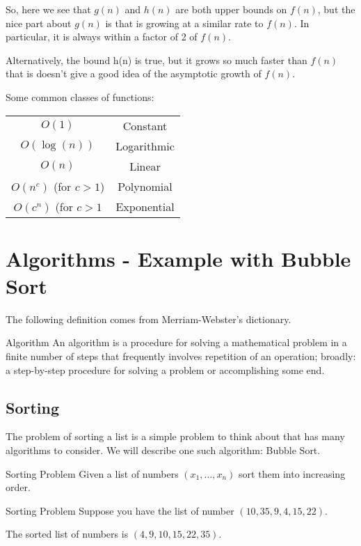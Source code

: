 So, here we see that $g(n)$ and $h(n)$ are both upper bounds on $f(n)$, but the nice part about $g(n)$ is that is growing at a similar rate to $ f(n)$.  In particular, it is always within a factor of 2 of $f(n)$.  

Alternatively, the bound h(n) is true, but it grows so much faster than $f(n)$ that is doesn't give a good idea of the asymptotic growth of $f(n)$.




Some common classes of functions:
\begin{center}
\begin{tabular}{|c|c|}
\hline
$O(1)$ & Constant\\
$O(\log(n))$ & Logarithmic\\
$O(n)$ & Linear\\
$O(n^c)$ (for $c > 1$) & Polynomial\\
$O(c^n)$  (for $c > 1$ & Exponential\\
\hline
\end{tabular}
\end{center}
\begin{center}
\end{center}
\section{Algorithms - Example with Bubble Sort}
The following definition comes from Merriam-Webster's dictionary.
\begin{definition}{Algorithm}{}
An algorithm is a procedure for solving a mathematical problem in a finite number of steps that frequently involves repetition of an operation; broadly: a step-by-step procedure for solving a problem or accomplishing some end.
\end{definition}
\subsection{Sorting }


The problem of sorting a list is a simple problem to think about that has many algorithms to consider.  We will describe one such algorithm: Bubble Sort. 

\begin{general}{Sorting Problem}{\polynomial}{}
Given a list of numbers $(x_1, \dots, x_n)$ sort them into increasing order.  
\end{general}

\begin{example}{Sorting Problem}{}
Suppose you have the list of number $(10, 35, 9, 4, 15, 22)$.

The sorted list of numbers is $(4,9,10,15,22,35)$.
\end{example}

